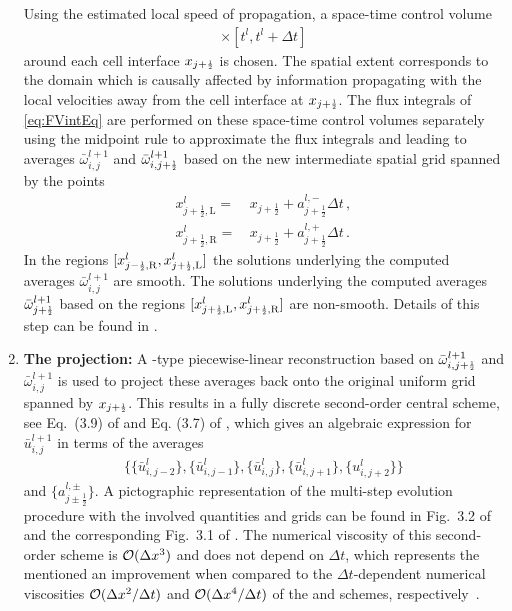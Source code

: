 \begin{enumerate}[label=\textbf{\arabic*}.]
	Using the estimated local speed of propagation, a space-time control volume
	\begin{align}
		[x_{j + \frac{1}{2}, \mathrm{L}}^l , x_{j + \frac{1}{2}, \mathrm{R}}^l ] \times [ t^l, t^l + \Delta t ]
	\end{align}
	around each cell interface $x_{j + \ttfrac{1}{2}}$ is chosen.
	The spatial extent corresponds to the domain which is causally affected by information propagating with the local velocities away from the cell interface at $x_{j + \ttfrac{1}{2}}$.
	The flux integrals of \cref{eq:FVintEq} are performed on these space-time control volumes separately using the midpoint rule to approximate the flux integrals and leading to averages $\bar{\omega}_{i,j}^{l+1}$ and $\bar{\omega}_{i,j+\ttfrac{1}{2}}^{l+1}$ based on the new intermediate spatial grid spanned by the points
		\begin{subequations}
		\begin{align}
			x_{j + \frac{1}{2}, \mathrm{L}}^l = \, & x_{j + \frac{1}{2}} + a_{j + \frac{1}{2}}^{l,-}\Delta t \, ,\\[.1em]
			x_{j + \frac{1}{2}, \mathrm{R}}^l = \, & x_{j + \frac{1}{2}} + a_{j + \frac{1}{2}}^{l,+}\Delta t \, .
		\end{align}
		\end{subequations}
	In the regions $[ x_{j - \ttfrac{1}{2}, \mathrm{R}}^l, x_{j + \ttfrac{1}{2}, \mathrm{L}}^l ]$ the solutions underlying the computed averages $\bar{\omega}_{i,j}^{l+1}$ are smooth.
	The solutions underlying the computed averages $\bar{\omega}_{j+\ttfrac{1}{2}}^{l+1}$ based on the regions $[ x_{j + \ttfrac{1}{2}, \mathrm{L}}^l, x_{j + \ttfrac{1}{2}, \mathrm{R}}^l ]$ are non-smooth.
	Details of this step can be found in .
	
	\item	\textbf{The projection:} A \muscl{}-type piecewise-linear reconstruction based on $\bar{\omega}_{i,j + \ttfrac{1}{2}}^{l+1}$ and $\bar{\omega}_{i,j}^{l+1}$ is used to project these averages back onto the original uniform grid spanned by $x_{j + \ttfrac{1}{2}}$.
	This results in a fully discrete second-order central scheme, see Eq.~(3.9) of  and Eq. (3.7) of , which gives an algebraic expression for $\bar{u}_{i,j}^{l+1}$ in terms of the averages
		\begin{align}
			\big\{ \{\bar{u}_{i,j - 2}^l\}, \{\bar{u}_{i,j - 1}^l\}, \{\bar{u}_{i,j}^l\}, \{\bar{u}_{i,j + 1}^l\}, \{u_{i,j + 2}^l\} \big\}	\label{eq:kt_stencil}
		\end{align}
	and $\{ a_{j \pm \frac{1}{2}}^{l,\pm} \}$.
	A pictographic representation of the multi-step evolution procedure with the involved quantities and grids can be found in Fig.~3.2 of  and the corresponding Fig.~3.1 of .
	The numerical viscosity of this second-order scheme is $\mathcal{O} ( \Delta x^3 )$ and does not depend on $\Delta t$, which represents the mentioned an improvement when compared to the $\Delta t$-dependent numerical viscosities $\mathcal{O} ( \Delta x^2/\Delta t )$ and $\mathcal{O} ( \Delta x^4/\Delta t )$ of the \lxf{} and \nt{} schemes, respectively~\cite{KTO2-0,KTO2-1}.
\end{enumerate}


